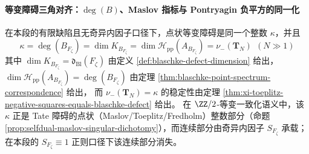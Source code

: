 \paragraph{等变障碍三角对齐：\texorpdfstring{$\deg(B)$}{deg(B)}、Maslov 指标与 Pontryagin 负平方的同一化}
\begin{theorem}[点状障碍的三重同一]\label{thm:xi-tate-maslov-pontryagin-unification}
在本段的有限缺陷且无奇异内因子口径下，点状等变障碍是同一个整数 \(\kappa\)，并且
\[
\boxed{\;
\kappa=\deg(B_{F_{\zeta}})
=\dim K_{B_{F_{\zeta}}}
=\dim\mathcal{H}_{\mathrm{pp}}(A_{B_{F_{\zeta}}})
=\nu_-(\mathbf{T}_N)\ \ (N\gg 1)\;}
\]
其中 \(\dim K_{B_{F_{\zeta}}}=\mathfrak d_{\mathrm{Bl}}(F_{\zeta})\) 由定义 \ref{def:blaschke-defect-dimension} 给出，
\(\dim\mathcal{H}_{\mathrm{pp}}(A_{B_{F_{\zeta}}})=\deg(B_{F_{\zeta}})\) 由定理 \ref{thm:blaschke-point-spectrum-correspondence} 给出，
而 \(\nu_-(\mathbf{T}_N)=\kappa\) 的稳定性由定理 \ref{thm:xi-toeplitz-negative-squares-equals-blaschke-defect} 给出。
在 \(\ZZ/2\)-等变一致化语义中，该 \(\kappa\) 正是 Tate 障碍的点状（Maslov/Toeplitz/Fredholm）整数部分（命题 \ref{prop:selfdual-maslov-singular-dichotomy}），而连续部分由奇异内因子 \(S_{F_{\zeta}}\) 承载；在本段的 \(S_{F_{\zeta}}\equiv 1\) 正则口径下该连续部分消失。
\end{theorem}

\endinput
